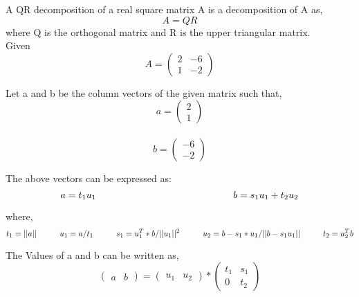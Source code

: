 \documentclass{article}
\begin{document}
\begin{itemize}
A QR decomposition of a real square matrix A is a decomposition of A as,\\

$$ A=QR$$
 where Q is the orthogonal matrix and R is the upper triangular matrix.\\
 
 Given\\
 \[
A=
\begin{pmatrix}
2 & -6\\
1 & -2
\end{pmatrix}
\]

Let a and b be the column vectors of the given matrix such that,\\

\[
a=
\begin{pmatrix}
2\\
1
\end{pmatrix}
\]
\\
\[
b=
\begin{pmatrix}
-6\\
-2
\end{pmatrix}
\]


The above vectors can be expressed as:\\

$$
a=t_1u_1\\
\hspace{5 cm}b=s_1u_1+t_2u_2
$$

where,\\

$$
t_1=||a||\\
\hspace{1 cm}u_1=a/t_1\\
\hspace{1 cm}s_1=u_1^{T}*b/||u_1||^{2}\\
\hspace{1 cm}u_2=b-s_1*u_1/||b-s_1u_1||\\
\hspace{1 cm}t_2=u_2^{T}b
$$

The Values of a and b can be written as,\\

\[
\begin{pmatrix}
a & b
\end{pmatrix}
=
\begin{pmatrix}
u_1 & u_2
\end{pmatrix}
*
\begin{pmatrix}
t_1 & s_1\\
0   & t_2
\end{pmatrix}
\]


\end{itemize}
\end{document}
